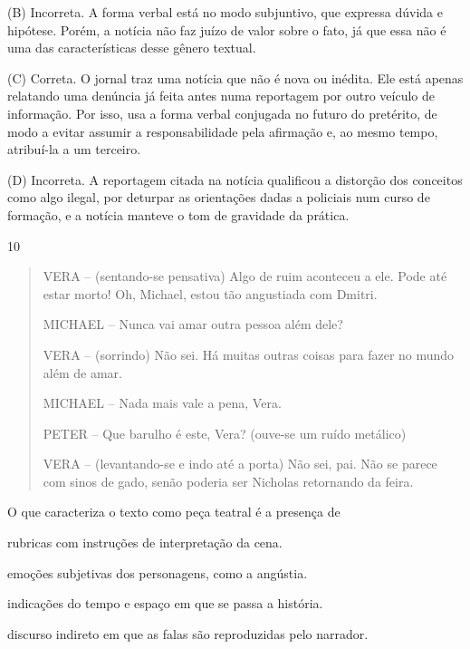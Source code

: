 (B) Incorreta. A forma verbal está no modo subjuntivo, que expressa
dúvida e hipótese. Porém, a notícia não faz juízo de valor sobre o fato,
já que essa não é uma das características desse gênero textual.

(C) Correta. O jornal traz uma notícia que não é nova ou inédita. Ele
está apenas relatando uma denúncia já feita antes numa reportagem por
outro veículo de informação. Por isso, usa a forma verbal conjugada no
futuro do pretérito, de modo a evitar assumir a responsabilidade pela
afirmação e, ao mesmo tempo, atribuí-la a um terceiro.

(D) Incorreta. A reportagem citada na notícia qualificou a distorção dos
conceitos como algo ilegal, por deturpar as orientações dadas a
policiais num curso de formação, e a notícia manteve o tom de gravidade
da prática.

\num{10}

\begin{quote}
VERA -- (sentando-se pensativa) Algo de ruim aconteceu a ele. Pode até
estar morto! Oh, Michael, estou tão angustiada com Dmitri.

MICHAEL -- Nunca vai amar outra pessoa além dele?

VERA -- (sorrindo) Não sei. Há muitas outras coisas para fazer no mundo
além de amar.

MICHAEL -- Nada mais vale a pena, Vera.

PETER -- Que barulho é este, Vera? (ouve-se um ruído metálico)

VERA -- (levantando-se e indo até a porta) Não sei, pai. Não se parece
com sinos de gado, senão poderia ser Nicholas retornando da feira.
\end{quote}


O que caracteriza o texto como peça teatral é a presença de

\begin{escolha}
\item rubricas com instruções de interpretação da cena.

\item emoções subjetivas dos personagens, como a angústia.

\item indicações do tempo e espaço em que se passa a história.

\item discurso indireto em que as falas são reproduzidas pelo narrador.
\end{escolha}

